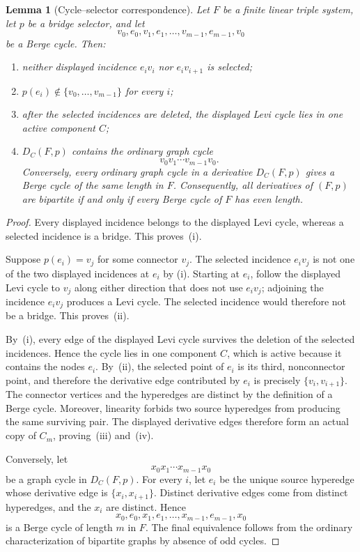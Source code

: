 \documentclass[11pt]{amsart}
\newtheorem{lemma}[lemma]{Lemma}
\theoremstyle{definition}
\theoremstyle{remark}
\numberwithin{equation}{section}
\begin{document}
\begin{lemma}[Cycle--selector correspondence]
\label{lem:cycle-selector}
Let $F$ be a finite linear triple system, let $p$ be a bridge selector,
and let
\[
 v_0,e_0,v_1,e_1,\ldots,v_{m-1},e_{m-1},v_0
\]
be a Berge cycle.  Then:
\begin{enumerate}[label=\textup{(\roman*)}]
\item neither displayed incidence $e_iv_i$ nor $e_iv_{i+1}$ is selected;
\item $p(e_i)\notin\{v_0,\ldots,v_{m-1}\}$ for every $i$;
\item after the selected incidences are deleted, the displayed Levi
cycle lies in one active component $C$;
\item $D_C(F,p)$ contains the ordinary graph cycle
\[
 v_0v_1\cdots v_{m-1}v_0.
\]
Conversely, every ordinary graph cycle in a derivative $D_C(F,p)$ gives
a Berge cycle of the same length in $F$.  Consequently, all derivatives
of $(F,p)$ are bipartite if and only if every Berge cycle of $F$ has
even length.
\end{enumerate}
\end{lemma}

\begin{proof}
Every displayed incidence belongs to the displayed Levi cycle, whereas
a selected incidence is a bridge.  This proves~\textup{(i)}.

Suppose $p(e_i)=v_j$ for some connector $v_j$.  The selected incidence
$e_iv_j$ is not one of the two displayed incidences at $e_i$ by
\textup{(i)}.  Starting at $e_i$, follow the displayed Levi cycle to
$v_j$ along either direction that does not use $e_iv_j$; adjoining the
incidence $e_iv_j$ produces a Levi cycle.  The selected incidence would
therefore not be a bridge.  This proves~\textup{(ii)}.

By~\textup{(i)}, every edge of the displayed Levi cycle survives the
deletion of the selected incidences.  Hence the cycle lies in one
component $C$, which is active because it contains the nodes $e_i$.
By~\textup{(ii)}, the selected point of $e_i$ is its third,
nonconnector point, and therefore the derivative edge contributed by
$e_i$ is precisely $\{v_i,v_{i+1}\}$.  The connector vertices and the
hyperedges are distinct by the definition of a Berge cycle.  Moreover,
linearity forbids two source hyperedges from producing the same surviving
pair.  The displayed derivative edges therefore form an actual copy of
$C_m$, proving~\textup{(iii)} and~\textup{(iv)}.

Conversely, let
\[
 x_0x_1\cdots x_{m-1}x_0
\]
be a graph cycle in $D_C(F,p)$.  For every $i$, let $e_i$ be the unique
source hyperedge whose derivative edge is $\{x_i,x_{i+1}\}$.  Distinct
derivative edges come from distinct hyperedges, and the $x_i$ are
distinct.  Hence
\[
 x_0,e_0,x_1,e_1,\ldots,x_{m-1},e_{m-1},x_0
\]
is a Berge cycle of length $m$ in $F$.  The final equivalence follows
from the ordinary characterization of bipartite graphs by absence of odd
cycles.
\end{proof}
\end{document}
